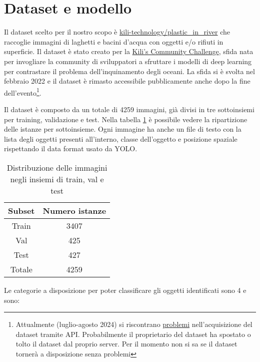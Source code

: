 \section*{Dataset e modello}

Il dataset scelto per il nostro scopo è \href{https://huggingface.co/datasets/kili-technology/plastic_in_river}{kili-technology/plastic\_in\_river}
che raccoglie immagini di laghetti e bacini d'acqua con oggetti e/o rifiuti in superficie. 
Il dataset è stato creato per la \href{https://kili-technology.com/data-labeling/machine-learning/kili-s-community-challenge-plastic-in-river-dataset}{Kili's Community Challenge},
sfida nata per invogliare la community di sviluppatori a sfruttare i modelli di deep learning per contrastare il problema dell'inquinamento degli oceani. 
La sfida si è svolta nel febbraio 2022 e il dataset è rimasto accessibile pubblicamente anche dopo la fine 
dell'evento\footnote[1]{Attualmente (luglio-agosto 2024) si riscontrano \href{https://huggingface.co/datasets/kili-technology/plastic_in_river/discussions/2}{problemi} nell'acquisizione del dataset tramite API. Probabilmente il proprietario del dataset 
ha spostato o tolto il dataset dal proprio server. Per il momento non si sa se il dataset tornerà a disposizione senza problemi}. 

Il dataset è composto da un totale di 4259 immagini, già divisi in tre sottoinsiemi per training, validazione e test. Nella tabella \ref{table:1} 
è possibile vedere la ripartizione delle istanze per sottoinsieme. Ogni immagine ha anche un file di testo con 
la lista degli oggetti presenti all'interno, classe dell'oggetto e posizione spaziale rispettando il data format usato da YOLO.

\begin{table}[h!]
    \centering
    \begin{tabular}{ |c||c| } 
     \hline
     \textbf{Subset} & \textbf{Numero istanze} \\ 
     \hline
     Train & 3407 \\ 
     Val & 425 \\ 
     Test & 427 \\ 
     \hline
     Totale & 4259 \\
     \hline
    \end{tabular}
    \caption{Distribuzione delle immagini negli insiemi di train, val e test }
\label{table:1}
    \end{table}

Le categorie a disposizione per poter classificare gli oggetti identificati sono 4 e sono:

